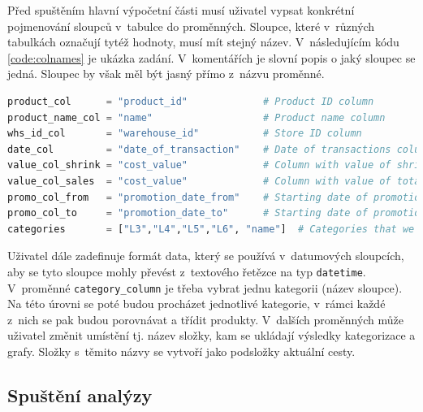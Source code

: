Před spuštěním hlavní výpočetní části musí uživatel vypsat konkrétní pojmenování sloupců v~tabulce do proměnných. Sloupce, které v~různých tabulkách označují tytéž hodnoty, musí mít stejný název. V~následujícím kódu \ref*{code:colnames} je ukázka zadání. V~komentářích je slovní popis o jaký sloupec se jedná. Sloupec by však měl být jasný přímo z~názvu proměnné.

\begin{lstlisting}[language=Python, style=mystyle, label={code:colnames}, caption={Definice konkrétních názvů sloupců.}]
product_col      = "product_id"             # Product ID column
product_name_col = "name"                   # Product name column
whs_id_col       = "warehouse_id"           # Store ID column
date_col         = "date_of_transaction"    # Date of transactions column - for sales and shrinks tables
value_col_shrink = "cost_value"             # Column with value of shrinks (shrink table)
value_col_sales  = "cost_value"             # Column with value of total sales (sales table)
promo_col_from   = "promotion_date_from"    # Starting date of promotion (promotion table)
promo_col_to     = "promotion_date_to"      # Starting date of promotion (promotion table)
categories       = ["L3","L4","L5","L6", "name"]  # Categories that we want to map to product ID (product hierarchy) 
\end{lstlisting}

Uživatel dále zadefinuje formát data, který se používá v~datumových sloupcích, aby se tyto sloupce mohly převést z~textového řetězce na typ \texttt{datetime}. V~proměnné \texttt{category\_column} je třeba vybrat jednu kategorii (název sloupce). Na této úrovni se poté budou procházet jednotlivé kategorie, v~rámci každé z~nich se pak budou porovnávat a třídit produkty. V~dalších proměnných může uživatel změnit umístění tj. název složky, kam se ukládají výsledky kategorizace a grafy. Složky s~těmito názvy se vytvoří jako podsložky aktuální cesty.


\subsection{Spuštění analýzy}

